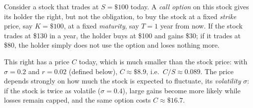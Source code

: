 Consider a stock that trades at $S = \$100$ today. A \emph{call option} on this stock
gives its holder the right, but not the obligation, to buy the stock at a fixed
\emph{strike} price, say $K = \$100$, at a fixed \emph{maturity}, say $T = 1$ year from
now. If the stock trades at \$130 in a year, the holder buys at \$100 and gains \$30;
if it trades at \$80, the holder simply does not use the option and loses nothing more.

This right has a price $C$ today, which is much smaller than the stock price: with
$\sigma = 0.2$ and $r = 0.02$ (defined below), $C \approx \$8.9$, i.e.\ $C/S \approx 0.089$.
The price depends strongly on how much the stock is expected to fluctuate, its
\emph{volatility} $\sigma$: if the stock is twice as volatile ($\sigma = 0.4$), large gains become
more likely while losses remain capped, and the same option costs $C \approx \$16.7$.